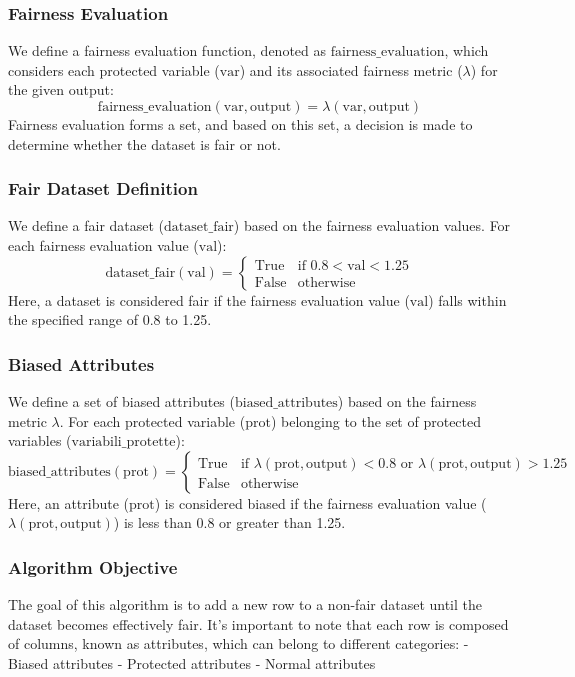 \documentclass[12pt,a4paper,openright,twoside]{book}
\begin{document}
\subsubsection{Fairness Evaluation}
We define a fairness evaluation function, denoted as \( \text{fairness\_evaluation} \), which considers each protected variable (\( \text{var} \)) and its associated fairness metric (\( \lambda \)) for the given output:
\[ \text{fairness\_evaluation}(\text{var}, \text{output}) = \lambda(\text{var}, \text{output}) \]
Fairness evaluation forms a set, and based on this set, a decision is made to determine whether the dataset is fair or not.

\subsubsection{Fair Dataset Definition}
We define a fair dataset (\( \text{dataset\_fair} \)) based on the fairness evaluation values. For each fairness evaluation value (\( \text{val} \)):
\[ \text{dataset\_fair}(\text{val}) = \begin{cases} 
      \text{True} & \text{if } 0.8 < \text{val} < 1.25 \\
      \text{False} & \text{otherwise}
   \end{cases}
\]
Here, a dataset is considered fair if the fairness evaluation value (\( \text{val} \)) falls within the specified range of 0.8 to 1.25.

\subsubsection{Biased Attributes}
We define a set of biased attributes (\( \text{biased\_attributes} \)) based on the fairness metric \( \lambda \). For each protected variable (\( \text{prot} \)) belonging to the set of protected variables (\( \text{variabili\_protette} \)):
\[ \text{biased\_attributes}(\text{prot}) = \begin{cases} 
      \text{True} & \text{if } \lambda(\text{prot}, \text{output}) < 0.8 \text{ or } \lambda(\text{prot}, \text{output}) > 1.25 \\
      \text{False} & \text{otherwise}
   \end{cases}
\]
Here, an attribute (\( \text{prot} \)) is considered biased if the fairness evaluation value (\( \lambda(\text{prot}, \text{output}) \)) is less than 0.8 or greater than 1.25.

\subsubsection{Algorithm Objective}
The goal of this algorithm is to add a new row to a non-fair dataset until the dataset becomes effectively fair. It's important to note that each row is composed of columns, known as attributes, which can belong to different categories:
- Biased attributes
- Protected attributes
- Normal attributes
\end{document}
